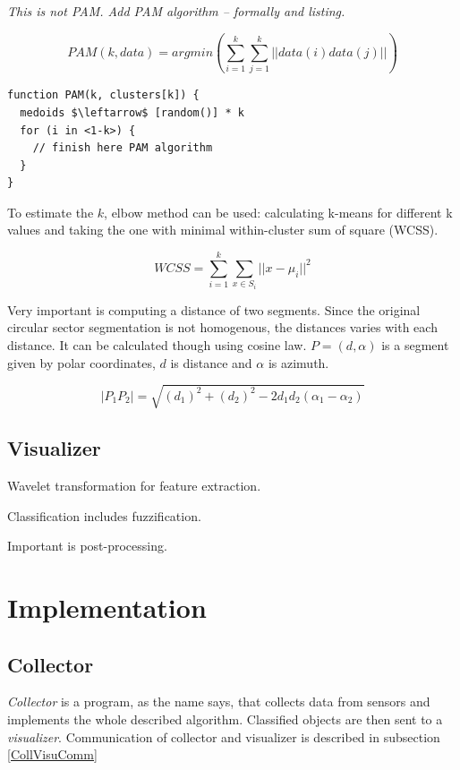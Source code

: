 {\it This is not PAM. Add PAM algorithm -- formally and listing.}

$$ \mathit{PAM}(k, data) = argmin \left( \sum_{i=1}^{k} \sum_{j=1}^{k} ||data(i) data(j)||  \right) $$

\begin{lstlisting}
function PAM(k, clusters[k]) {
  medoids $\leftarrow$ [random()] * k
  for (i in <1-k>) {
    // finish here PAM algorithm
  }
}
\end{lstlisting}

To estimate the $k$, elbow method can be used: calculating k-means for different k values and taking the one with
minimal within-cluster sum of square (WCSS).\cite{ClusterAnalysis} \cite{VagueNatureInformation}

$$\mathit{WCSS} = \sum_{i=1}^{k} \sum_{x \in S_i} ||x - \mu_i||^2$$

Very important is computing a distance of two segments. Since the original circular sector segmentation
is not homogenous, the distances varies with each distance. It can be calculated though using
cosine law. $P = (d, \alpha)$ is a segment given by polar coordinates, $d$ is distance and $\alpha$ is
azimuth.

$$|P_{1} P_{2}| = \sqrt{(d_{1})^{2} + (d_{2})^{2} - 2d_{1}d_{2}(\alpha_1 - \alpha_2)}$$




\section{Visualizer}




Wavelet transformation for feature extraction.

Classification includes fuzzification.

Important is post-processing.



\chapter{Implementation}

\section{Collector}
{\it Collector} is a program, as the name says, that collects data from sensors and implements
the whole described algorithm. Classified objects are then sent to a {\it visualizer}.
Communication of collector and visualizer is described in subsection \ref{CollVisuComm}

